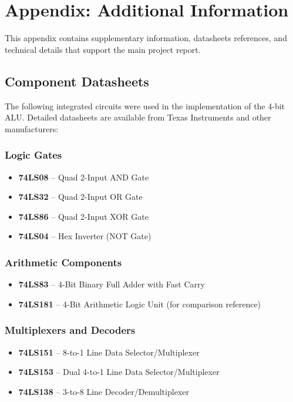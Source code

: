 \chapter{Appendix: Additional Information}

This appendix contains supplementary information, datasheets references, and technical details that support the main project report.

\section{Component Datasheets}

The following integrated circuits were used in the implementation of the 4-bit ALU. Detailed datasheets are available from Texas Instruments and other manufacturers:

\subsection{Logic Gates}
\begin{itemize}
    \item \textbf{74LS08} -- Quad 2-Input AND Gate
    \item \textbf{74LS32} -- Quad 2-Input OR Gate
    \item \textbf{74LS86} -- Quad 2-Input XOR Gate
    \item \textbf{74LS04} -- Hex Inverter (NOT Gate)
\end{itemize}

\subsection{Arithmetic Components}
\begin{itemize}
    \item \textbf{74LS83} -- 4-Bit Binary Full Adder with Fast Carry
    \item \textbf{74LS181} -- 4-Bit Arithmetic Logic Unit (for comparison reference)
\end{itemize}

\subsection{Multiplexers and Decoders}
\begin{itemize}
    \item \textbf{74LS151} -- 8-to-1 Line Data Selector/Multiplexer
    \item \textbf{74LS153} -- Dual 4-to-1 Line Data Selector/Multiplexer
    \item \textbf{74LS138} -- 3-to-8 Line Decoder/Demultiplexer
\end{itemize}

